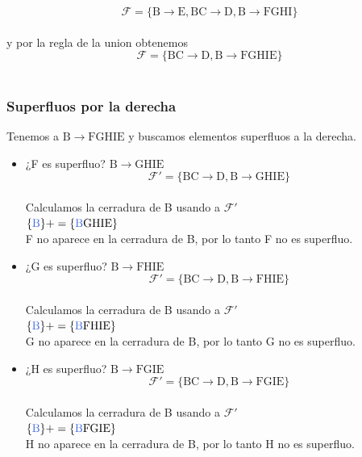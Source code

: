 \documentclass[10pt]{article}
\begin{document}
$$\mathcal{F}=\mathrm{\{ B \rightarrow E, BC \rightarrow D, B \rightarrow FGHI \}}$$ \\ 
y por la regla de la union obtenemos $$\mathcal{F}=\mathrm{\{ BC \rightarrow D, B \rightarrow FGHIE \}}$$ \\

\subsubsection{Superfluos por la derecha}

Tenemos a $\mathrm{B \rightarrow FGHIE}$ y buscamos elementos superfluos a la derecha.\\

\begin{itemize}
	\item ¿F es superfluo? $\mathrm{B \rightarrow GHIE}$ \\
	$$\mathcal{F}'=\mathrm{\{ BC \rightarrow D, B \rightarrow GHIE \}}$$\\
	Calculamos la cerradura de B usando a $\mathcal{F}'$\\
	$\mathrm{\{\textcolor{RoyalBlue}{B}\}+= \{\textcolor{RoyalBlue}{B}GHIE\}}$\\
	
	F no aparece en la cerradura de B, por lo tanto F no es superfluo.
	
	\item ¿G es superfluo? $\mathrm{B \rightarrow FHIE}$ \\
	$$\mathcal{F}'=\mathrm{\{ BC \rightarrow D, B \rightarrow FHIE \}}$$\\
	Calculamos la cerradura de B usando a $\mathcal{F}'$\\
	$\mathrm{\{\textcolor{RoyalBlue}{B}\}+= \{\textcolor{RoyalBlue}{B}FHIE\}}$\\
	
	G no aparece en la cerradura de B, por lo tanto G no es superfluo.
	
	\item ¿H es superfluo? $\mathrm{B \rightarrow FGIE}$ \\
	$$\mathcal{F}'=\mathrm{\{ BC \rightarrow D, B \rightarrow FGIE \}}$$\\
	Calculamos la cerradura de B usando a $\mathcal{F}'$\\
	$\mathrm{\{\textcolor{RoyalBlue}{B}\}+= \{\textcolor{RoyalBlue}{B}FGIE\}}$\\
	
	H no aparece en la cerradura de B, por lo tanto H no es superfluo.
	

\end{itemize}
\end{document}
